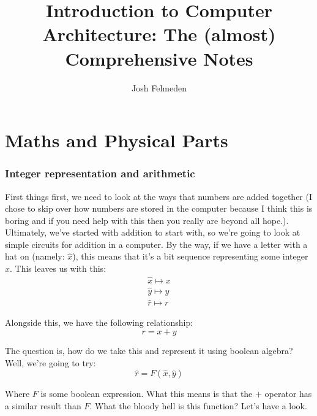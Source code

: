 \documentclass[11pt,a4paper,titlepage,dvipsnames,cmyk]{scrartcl}
\title{Introduction to Computer Architecture: The (almost) Comprehensive
Notes}
\author{Josh Felmeden}
\begin{document}
\maketitle

\tableofcontents
\newpage
{}

\part{Maths and Physical Parts}
\section{Integer representation and arithmetic}%
\label{sec:reallyboring}
First things first, we need to look at the ways that numbers are added together
(I chose to skip over how numbers are stored in the computer because I think
this is boring and if you need help with this then you really are beyond all
hope.). Ultimately, we've started with addition to start with, so we're going to
look at simple circuits for addition in a computer. By the way, if we have a
letter with a hat on (namely: $\hat x$), this means that it's a bit sequence
representing some integer $x$. This leaves us with this:
\begin{align*}
    \hat x \mapsto x \\
    \hat y \mapsto y \\
    \hat r \mapsto r
\end{align*}

Alongside this, we have the following relationship:
\begin{equation}
    r = x + y
\end{equation}

The question is, how do we take this and represent it using boolean algebra?
Well, we're going to try:
\begin{equation}
    \hat r = F(\hat x, \hat y)
\end{equation}

Where $F$ is some boolean expression. What this means is that the $+$ operator
has a similar result than $F$. What the bloody hell is this function? Let's have
a look.
\end{document}
